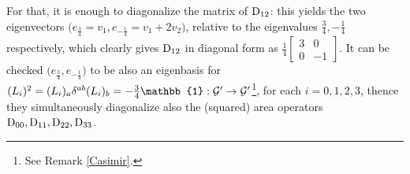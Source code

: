 For that, it is enough to diagonalize the matrix of $\text{\normalfont D}_{12}$: this yields the two eigenvectors $\bigg(e_{\frac{3}{4}}=v_1, e_{-\frac{1}{4}}=v_1+2v_2\bigg)$, relative to the eigenvalues $\frac{3}{4}, -\frac{1}{4}$ respectively, which clearly gives $\text{\normalfont D}_{12}$ in diagonal form as $\frac{1}{4}\begin{bmatrix}
    3&0\\
    0&-1
\end{bmatrix}$. It can be checked $\bigg(e_{\frac{3}{4}},e_{-\frac{1}{4}}\bigg)$ to be also an eigenbasis for $(L_i)^2=(L_i)_a\delta^{ab}(L_i)_b=-\frac{3}{4}\mathbb{1}:\Gg'\to\Gg'$\footnote{See Remark \ref{Casimir}.}, for each $i=0,1,2,3$, thence they simultaneously diagonalize also the (squared) area operators $\text{\normalfont D}_{00}, \text{\normalfont D}_{11}, \text{\normalfont D}_{22}, \text{\normalfont D}_{33}$. %

